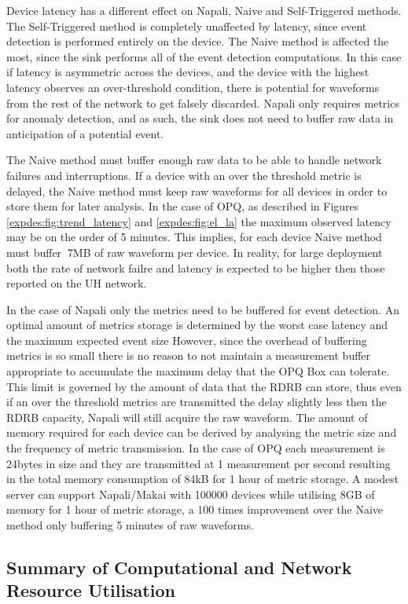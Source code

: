 Device latency has a different effect on Napali, Naive and Self-Triggered methods.
The Self-Triggered method is completely unaffected by latency, since event detection is performed entirely on the device.
The Naive method is affected the most, since the sink performs all of the event detection computations.
In this case if latency is asymmetric across the devices, and the device with the highest latency observes an over-threshold condition,
there is potential for waveforms from the rest of the network to get falsely discarded.
Napali only requires metrics for anomaly detection, and as such, the sink does not need to buffer raw data in anticipation of a potential event.

The Naive method must buffer enough raw data to be able to handle network failures and interruptions.
If a device with an over the threshold metric is delayed, the Naive method must keep raw waveforms for all devices in order to store them for later analysis.
In the case of OPQ, as described in Figures \ref{expdes:fig:trend_latency} and \ref{expdes:fig:el_la} the maximum observed latency may be on the order of 5 minutes.
This implies, for each device Naive method must buffer $~$7MB of raw waveform per device.
In reality, for large deployment both the rate of network failre and latency is expected to be higher then those reported on the UH network.

In the case of Napali only the metrics need to be buffered for event detection.
An optimal amount of metrics storage is determined by the worst case latency and the maximum expected event size
However, since the overhead of buffering metrics is so small there is no reason to not maintain a measurement buffer appropriate to accumulate the maximum delay that the OPQ Box can tolerate.
This limit is governed by the amount of data that the RDRB can store, thus even if an over the threshold metrics are transmitted the delay slightly less then the RDRB capacity, Napali will still acquire the raw waveform.
The amount of memory required for each device can be derived by analysing the metric size and the frequency of metric transmission.
In the case of OPQ each measurement is 24bytes in size and they are transmitted at 1 measurement per second resulting in the total memory consumption of 84kB for 1 hour of metric storage.
A modest server can support Napali/Makai with 100000 devices while utilising 8GB of memory for 1 hour of metric storage, a 100 times improvement over the Naive method only buffering 5 minutes of raw waveforms.


\subsection{Summary of Computational and Network Resource Utilisation}\label{subsec:summary-of-computational-and-network-recource-utilisaztion}

